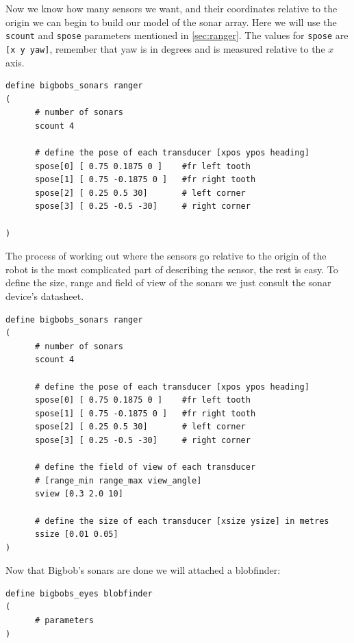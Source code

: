 \documentclass[a4paper]{article}
\begin{document}
Now we know how many sensors we want, and their coordinates relative to the origin we can begin to build our model of the sonar array. Here we will use the \verb|scount| and \verb|spose| parameters mentioned in \ref{sec:ranger}. The values for \verb|spose| are \verb|[x y yaw]|, remember that yaw is in degrees and is measured relative to the $x$ axis.
\begin{verbatim}
define bigbobs_sonars ranger
(
      # number of sonars
      scount 4

      # define the pose of each transducer [xpos ypos heading]
      spose[0] [ 0.75 0.1875 0 ]	#fr left tooth
      spose[1] [ 0.75 -0.1875 0 ]	#fr right tooth
      spose[2] [ 0.25 0.5 30]		# left corner
      spose[3] [ 0.25 -0.5 -30]		# right corner

)
\end{verbatim}

The process of working out where the sensors go relative to the origin of the robot is the most complicated part of describing the sensor, the rest is easy. To define the size, range and field of view of the sonars we just consult the sonar device's datasheet.
\begin{verbatim}
define bigbobs_sonars ranger
(
      # number of sonars
      scount 4

      # define the pose of each transducer [xpos ypos heading]
      spose[0] [ 0.75 0.1875 0 ]	#fr left tooth
      spose[1] [ 0.75 -0.1875 0 ]	#fr right tooth
      spose[2] [ 0.25 0.5 30]		# left corner
      spose[3] [ 0.25 -0.5 -30]		# right corner
      
      # define the field of view of each transducer 
      # [range_min range_max view_angle]
      sview [0.3 2.0 10]

      # define the size of each transducer [xsize ysize] in metres
      ssize [0.01 0.05]
)
\end{verbatim}

Now that Bigbob's sonars are done we will attached a blobfinder:
\begin{verbatim}
define bigbobs_eyes blobfinder
(
      # parameters
)
\end{verbatim}
\end{document}
